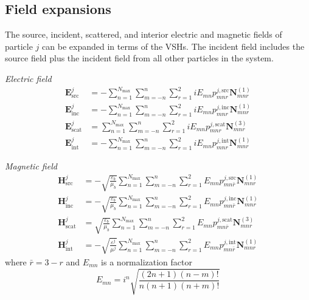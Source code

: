 \documentclass[11pt]{article}
\begin{document}
\subsection{Field expansions}
The source, incident, scattered, and interior electric and magnetic fields of particle $j$ can be expanded in terms of the VSHs.
The incident field includes the source field plus the incident field from all other particles in the system.
\newline

\textit{Electric field}
\begin{subequations}
\begin{align}
    \boldsymbol{E}_\text{src}^j &= - \sum_{n=1}^{N_\text{max}} \sum_{m=-n}^{n} \sum_{r=1}^2
    iE_{mn} p_{mnr}^{j,\text{src}} \boldsymbol{N}_{mnr}^{(1)} \\
    \boldsymbol{E}_\text{inc}^j &= - \sum_{n=1}^{N_\text{max}} \sum_{m=-n}^{n} \sum_{r=1}^2
    iE_{mn} p_{mnr}^{j,\text{inc}} \boldsymbol{N}_{mnr}^{(1)} \\
    \boldsymbol{E}_\text{scat}^j &= \sum_{n=1}^{N_\text{max}} \sum_{m=-n}^{n} \sum_{r=1}^2
    iE_{mn} p_{mnr}^{j,\text{scat}} \boldsymbol{N}_{mnr}^{(3)} \\
    \boldsymbol{E}_\text{int}^j &= - \sum_{n=1}^{N_\text{max}} \sum_{m=-n}^{n} \sum_{r=1}^2
    iE_{mn} p_{mnr}^{j,\text{int}} \boldsymbol{N}_{mnr}^{(1)}
\end{align}
\label{eqn:electric_field_expansion}
\end{subequations}

\textit{Magnetic field}
\begin{subequations}
\begin{align}
    \boldsymbol{H}_\text{src}^j &= - \sqrt{\frac{\varepsilon_b}{\mu_b}} \sum_{n=1}^{N_\text{max}} \sum_{m=-n}^{n} \sum_{r=1}^2
    E_{mn} p_{mn\bar r}^{j,\text{src}} \boldsymbol{N}_{mnr}^{(1)} \\
    \boldsymbol{H}_\text{inc}^j &= - \sqrt{\frac{\varepsilon_b}{\mu_b}} \sum_{n=1}^{N_\text{max}} \sum_{m=-n}^{n} \sum_{r=1}^2
    E_{mn} p_{mn\bar r}^{j,\text{inc}} \boldsymbol{N}_{mnr}^{(1)} \\
    \boldsymbol{H}_\text{scat}^j &= \sqrt{\frac{\varepsilon_b}{\mu_b}} \sum_{n=1}^{N_\text{max}} \sum_{m=-n}^{n} \sum_{r=1}^2
    E_{mn} p_{mn\bar r}^{j,\text{scat}} \boldsymbol{N}_{mnr}^{(3)} \\
    \boldsymbol{H}_\text{int}^j &= - \sqrt{\frac{\varepsilon^j}{\mu^j}} \sum_{n=1}^{N_\text{max}} \sum_{m=-n}^{n} \sum_{r=1}^2
    E_{mn} p_{mn\bar r}^{j,\text{int}} \boldsymbol{N}_{mnr}^{(1)}
\end{align}
\label{eqn:magnetic_field_expansion}
\end{subequations}
where $\bar r = 3-r$ and $E_{mn}$ is a normalization factor
\begin{equation}
    E_{mn} = i^n \sqrt{\frac{(2n+1)(n-m)!}{n(n+1)(n+m)!}}
\end{equation}
\end{document}
